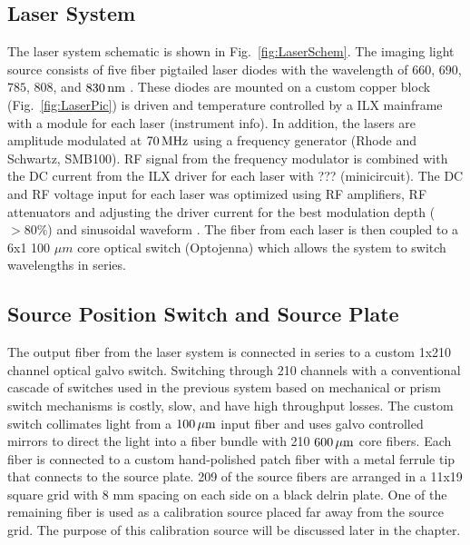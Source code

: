 \subsection{Laser System}
The laser system schematic is shown in Fig.~\ref{fig:LaserSchem}. The imaging light source consists of five fiber pigtailed laser diodes with the wavelength of $660$, $690$, $785$, $808$, and $830\,{\rm nm}$ . These diodes are mounted on a custom copper block (Fig.~\ref{fig:LaserPic}) is driven and temperature controlled by a ILX mainframe with a module for each laser (instrument info). In addition, the lasers are amplitude modulated at $70\,{\rm MHz}$ using a frequency generator (Rhode and Schwartz, SMB100). RF signal from the frequency modulator is combined with the DC current from the ILX driver for each laser with ??? (minicircuit). The DC and RF voltage input for each laser was optimized using RF amplifiers, RF attenuators and adjusting the driver current for the best modulation depth ($>80 \%$) and sinusoidal waveform . The fiber from each laser is then coupled to a 6x1 100 $\mu m$ core optical switch (Optojenna) which allows the system to switch wavelengths in series.

\subsection{Source Position Switch and Source Plate}
The output fiber from the laser system is connected in series to a custom 1x210 channel optical galvo switch. Switching through 210 channels with a conventional cascade of switches used in the previous system based on mechanical or prism switch mechanisms is costly, slow, and have high throughput losses. The custom switch collimates light from a $100\,\mu{\rm m}$ input fiber and uses galvo controlled mirrors to direct the light into a fiber bundle with 210 $600\,\mu{\rm m}$ core fibers. Each fiber is connected to a custom hand-polished patch fiber with a metal ferrule tip that connects to the source plate. 209 of the source fibers are arranged in a 11x19 square grid with 8 mm spacing on each side on a black delrin plate. One of the remaining fiber is used as a calibration source placed far away from the source grid. The purpose of this calibration source will be discussed later in the chapter.


